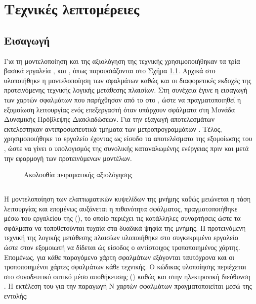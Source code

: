 \chapter{Τεχνικές λεπτομέρειες}
\label{chap7}

\section{Εισαγωγή}
\label{chap7_Intro}

Για τη μοντελοποίηση και της αξιολόγηση της τεχνικής χρησιμοποιήθηκαν τα τρία βασικά εργαλεία \matlabR, \gem και \mcpat, όπως παρουσιάζονται στο Σχήμα \ref{fig:chap7_simulation_tools}. Αρχικά στο \matlab υλοποιήθηκε η μοντελοποίηση των σφαλμάτων καθώς και οι διαφορετικές εκδοχές της προτεινόμενης τεχνικής λογικής μετάθεσης πλαισίων. Στη συνέχεια έγινε η εισαγωγή των χαρτών σφαλμάτων που παρήχθησαν από το \matlab στο \gem, ώστε να πραγματοποιηθεί η εξομοίωση λειτουργίας ενός επεξεργαστή όταν υπάρχουν σφάλματα στη Μονάδα Δυναμικής Πρόβλεψης Διακλαδώσεων. Για την εξαγωγή αποτελεσμάτων εκτελέστηκαν αντιπροσωπευτικά τμήματα των μετροπρογραμμάτων \spec. Τέλος, χρησιμοποιήθηκε το εργαλείο \mcpat έχοντας ως είσοδο τα αποτελέσματα της εξομοίωσης του \gem, ώστε να γίνει ο υπολογισμός της συνολικής καταναλωμένης ενέργειας πριν και μετά την εφαρμογή των προτεινόμενων μοντέλων.

\begin{figure}[h]
    \centering
    \caption{Ακολουθία πειραματικής αξιολόγησης}
    \label{fig:chap7_simulation_tools}
\end{figure}


\section{\matlab}
\label{chap7_matlab}

Η μοντελοποίηση των ελαττωματικών κυψελίδων της μνήμης καθώς μειώνεται η τάση λειτουργίας και επομένως αυξάνεται η πιθανότητα σφάλματος, πραγματοποιήθηκε μέσω του εργαλείου \matlabR της  (), το οποίο περιέχει τις κατάλληλες συναρτήσεις ώστε τα σφάλματα να τοποθετούνται τυχαία στα δυαδικά ψηφία της μνήμης. Η προτεινόμενη τεχνική της λογικής μετάθεσης πλαισίων υλοποιήθηκε στο συγκεκριμένο εργαλείο ώστε στον εξομοιωτή να δίδεται ώς είσοδος ο αντίστοιχος τροποποιημένος χάρτης. Επομένως, για κάθε παραγόμενο χάρτη σφαλμάτων εξάγονται ταυτόχρονα και οι τροποποιημένοι χάρτες σφαλμάτων κάθε τεχνικής. Ο κώδικας υλοποίησης περιέχεται στο συνοδευτικό οπτικό μέσο αποθήκευσης () καθώς και στην ηλεκτρονική διεύθυνση . Η εκτέλεση του για την παραγωγή Ν χαρτών σφαλμάτων πραγματοποιείται μεσώ της εντολής:

